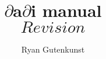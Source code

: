 \documentclass{report}
\newcommand{\dadi}{$\partial$a$\partial$i\xspace}
\begin{document}
\title{\dadi manual\\\normalsize  $$Revision$$}
\author{Ryan Gutenkunst}
\maketitle
\end{document}
